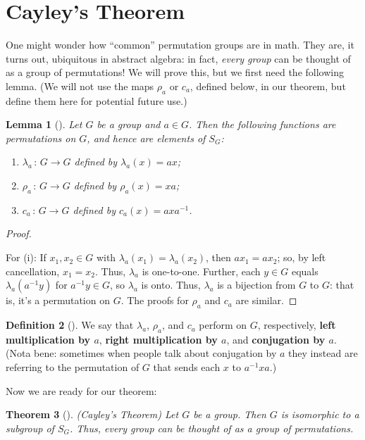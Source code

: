 \documentclass[10pt,]{book}
\newcommand{\terminology}[1]{\textbf{#1}}
\theoremstyle{plain}
\newtheorem{theorem}{Theorem}[section]
\newtheorem{lemma}[theorem]{Lemma}
\theoremstyle{definition}
\newtheorem{definition}[theorem]{Definition}
\theoremstyle{definition}
\theoremstyle{definition}
\theoremstyle{definition}
\numberwithin{equation}{section}
\begin{document}
\section[{Cayley's Theorem}]{Cayley's Theorem}\label{section-20}
One might wonder how ``common'' permutation groups are in math. They are, it turns out, ubiquitous in abstract algebra: in fact, \emph{every group} can be thought of as a group of permutations! We will prove this, but we first need the following lemma. (We will not use the maps \(\rho_a\) or \(c_a\), defined below, in our theorem, but define them here for potential future use.)%
\begin{lemma}[{}]\label{cay_lem}
Let \(G\) be a group and \(a\in G\). Then the following functions are permutations on \(G\), and hence are elements of \(S_G\): \leavevmode%
\begin{enumerate}
\item\hypertarget{li-331}{}\(\lambda_a\,:\,G\to G\) defined by \(\lambda_a(x)=ax\);%
\item\hypertarget{li-332}{}\(\rho_a\,:\,G\to G\) defined by \(\rho_a(x)=xa\);%
\item\hypertarget{li-333}{}\(c_a\,:\,G\to G\) defined by \(c_a(x)=axa^{-1}\).%
\end{enumerate}
%
\end{lemma}
\begin{proof}\hypertarget{proof-29}{}
For (i): If \(x_1,x_2 \in G\) with \(\lambda_a(x_1)=\lambda_a(x_2)\), then \(ax_1=ax_2\); so, by left cancellation, \(x_1=x_2\). Thus, \(\lambda_a\) is one-to-one. Further, each \(y\in G\) equals \(\lambda_a(a^{-1}y)\) for \(a^{-1}y\in G\), so \(\lambda_a\) is onto. Thus, \(\lambda_a\) is a bijection from \(G\) to \(G\): that is, it's a permutation on \(G\). The proofs for \(\rho_a\) and \(c_a\) are similar.%
\end{proof}
\begin{definition}[{}]\label{definition-51}
We say that \(\lambda_a\), \(\rho_a\), and \(c_a\) perform on \(G\), respectively, \terminology{left multiplication by \(a\)}, \terminology{right multiplication by \(a\)}, and \terminology{conjugation by \(a\)}. (Nota bene: sometimes when people talk about conjugation by \(a\) they instead are referring to the permutation of \(G\) that sends each \(x\) to \(a^{-1}xa\).)%
\end{definition}
Now we are ready for our theorem:%
\begin{theorem}[{}]\label{theorem-38}
(Cayley's Theorem) Let \(G\) be a group. Then \(G\) is isomorphic to a subgroup of \(S_G\). Thus, every group can be thought of as a group of permutations.%
\end{theorem}
\end{document}
